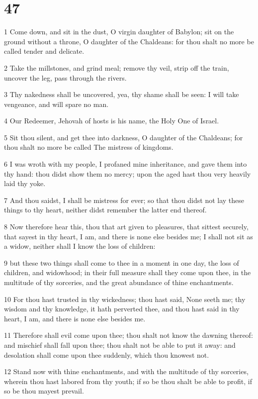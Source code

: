 \chapter{47}

\par 1 Come down, and sit in the dust, O virgin daughter of Babylon; sit on the ground without a throne, O daughter of the Chaldeans: for thou shalt no more be called tender and delicate.
\par 2 Take the millstones, and grind meal; remove thy veil, strip off the train, uncover the leg, pass through the rivers.
\par 3 Thy nakedness shall be uncovered, yea, thy shame shall be seen: I will take vengeance, and will spare no man.
\par 4 Our Redeemer, Jehovah of hosts is his name, the Holy One of Israel.
\par 5 Sit thou silent, and get thee into darkness, O daughter of the Chaldeans; for thou shalt no more be called The mistress of kingdoms.
\par 6 I was wroth with my people, I profaned mine inheritance, and gave them into thy hand: thou didst show them no mercy; upon the aged hast thou very heavily laid thy yoke.
\par 7 And thou saidst, I shall be mistress for ever; so that thou didst not lay these things to thy heart, neither didst remember the latter end thereof.
\par 8 Now therefore hear this, thou that art given to pleasures, that sittest securely, that sayest in thy heart, I am, and there is none else besides me; I shall not sit as a widow, neither shall I know the loss of children:
\par 9 but these two things shall come to thee in a moment in one day, the loss of children, and widowhood; in their full measure shall they come upon thee, in the multitude of thy sorceries, and the great abundance of thine enchantments.
\par 10 For thou hast trusted in thy wickedness; thou hast said, None seeth me; thy wisdom and thy knowledge, it hath perverted thee, and thou hast said in thy heart, I am, and there is none else besides me.
\par 11 Therefore shall evil come upon thee; thou shalt not know the dawning thereof: and mischief shall fall upon thee; thou shalt not be able to put it away: and desolation shall come upon thee suddenly, which thou knowest not.
\par 12 Stand now with thine enchantments, and with the multitude of thy sorceries, wherein thou hast labored from thy youth; if so be thou shalt be able to profit, if so be thou mayest prevail.
